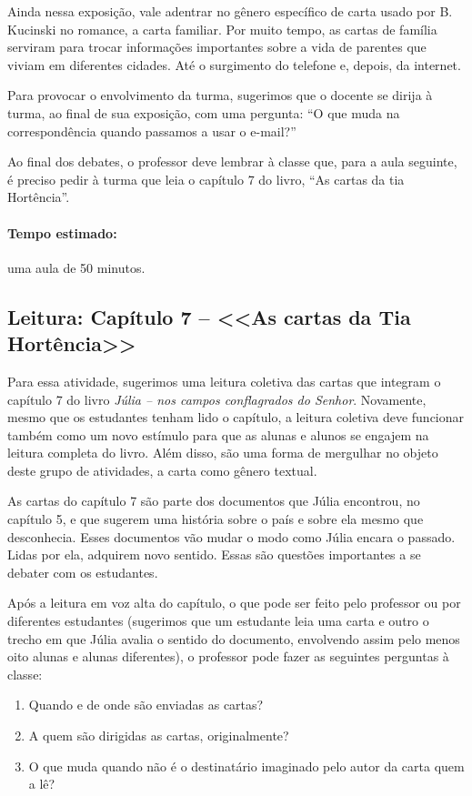 \documentclass[12pt]{extarticle}
\begin{document}
Ainda nessa exposição, vale adentrar no gênero específico de carta usado
por B. Kucinski no romance, a carta familiar. Por muito tempo, as cartas
de família serviram para trocar informações importantes sobre a vida de
parentes que viviam em diferentes cidades. Até o surgimento do telefone
e, depois, da internet.

Para provocar o envolvimento da turma, sugerimos que o docente se dirija
à turma, ao final de sua exposição, com uma pergunta: ``O que muda na
correspondência quando passamos a usar o e-mail?''

Ao final dos debates, o professor deve lembrar à classe que, para a aula
seguinte, é preciso pedir à turma que leia o capítulo 7 do livro, ``As
cartas da tia Hortência''.

\paragraph{Tempo estimado:} uma aula de 50 minutos.

\subsection{Leitura: Capítulo 7 -- <<As cartas da Tia Hortência>>}

Para essa atividade, sugerimos uma leitura coletiva das cartas que
integram o capítulo 7 do livro \emph{Júlia -- nos campos conflagrados do
Senhor}. Novamente, mesmo que os estudantes tenham lido o capítulo, a
leitura coletiva deve funcionar também como um novo estímulo para que as
alunas e alunos se engajem na leitura completa do livro. Além disso, são
uma forma de mergulhar no objeto deste grupo de atividades, a carta como
gênero textual.

As cartas do capítulo 7 são parte dos documentos que Júlia encontrou, no
capítulo 5, e que sugerem uma história sobre o país e sobre ela mesmo
que desconhecia. Esses documentos vão mudar o modo como Júlia encara o
passado. Lidas por ela, adquirem novo sentido. Essas são questões
importantes a se debater com os estudantes.

Após a leitura em voz alta do capítulo, o que pode ser feito pelo
professor ou por diferentes estudantes (sugerimos que um estudante leia
uma carta e outro o trecho em que Júlia avalia o sentido do documento,
envolvendo assim pelo menos oito alunas e alunas diferentes), o
professor pode fazer as seguintes perguntas à classe:

\begin{enumerate}

\item Quando e de onde são enviadas as cartas?

\item A quem são dirigidas as cartas, originalmente?

\item O que muda quando não é o destinatário imaginado pelo autor da carta
  quem a lê?

\end{enumerate}
\end{document}
